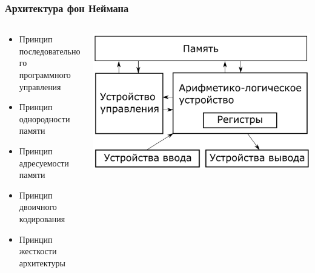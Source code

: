 \documentclass[xetex,mathserif,serif]{beamer}
\begin{document}
    \begin{frame}
        \frametitle{Архитектура фон Неймана}
        \begin{columns}
            \begin{column}{0.6\textwidth}
                \begin{itemize}
                    \item Принцип последовательного программного управления
                    \item Принцип однородности памяти
                    \item Принцип адресуемости памяти
                    \item Принцип двоичного кодирования
                    \item Принцип жесткости архитектуры
                \end{itemize}
            \end{column}
            \begin{column}{0.4\textwidth}
                \begin{center}
                    \includegraphics[width=\textwidth]{vonNeumannArchitecture.png}
                \end{center}
            \end{column}
        \end{columns}
    \end{frame}
\end{document}

